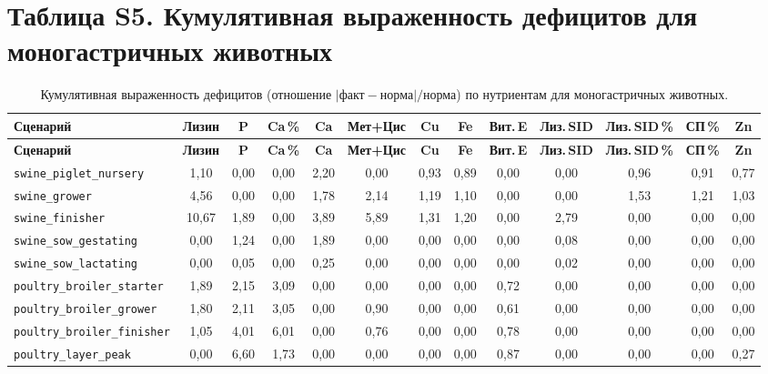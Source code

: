 \documentclass[11pt]{article}
\begin{document}
\section*{Таблица S5. Кумулятивная выраженность дефицитов для моногастричных животных}
{\footnotesize
\begin{longtable}{lcccccccccccc}
\caption{Кумулятивная выраженность дефицитов (отношение $|\text{факт} - \text{норма}| / \text{норма}$) по нутриентам для моногастричных животных.}\label{tab:s5_heatmap} \\
\toprule
\textbf{Сценарий} & \textbf{Лизин} & \textbf{P} & \textbf{Ca\,\%} & \textbf{Ca} & \textbf{Мет+Цис} & \textbf{Cu} & \textbf{Fe} & \textbf{Вит.\,E} & \textbf{Лиз.\,SID} & \textbf{Лиз.\,SID\,\%} & \textbf{СП\,\%} & \textbf{Zn} \\
\midrule
\endfirsthead
\toprule
\textbf{Сценарий} & \textbf{Лизин} & \textbf{P} & \textbf{Ca\,\%} & \textbf{Ca} & \textbf{Мет+Цис} & \textbf{Cu} & \textbf{Fe} & \textbf{Вит.\,E} & \textbf{Лиз.\,SID} & \textbf{Лиз.\,SID\,\%} & \textbf{СП\,\%} & \textbf{Zn} \\
\midrule
\endhead
\bottomrule
\endfoot
\bottomrule
\endlastfoot
\texttt{swine\_piglet\_nursery} & 1{,}10 & 0{,}00 & 0{,}00 & 2{,}20 & 0{,}00 & 0{,}93 & 0{,}89 & 0{,}00 & 0{,}00 & 0{,}96 & 0{,}91 & 0{,}77 \\
\texttt{swine\_grower} & 4{,}56 & 0{,}00 & 0{,}00 & 1{,}78 & 2{,}14 & 1{,}19 & 1{,}10 & 0{,}00 & 0{,}00 & 1{,}53 & 1{,}21 & 1{,}03 \\
\texttt{swine\_finisher} & 10{,}67 & 1{,}89 & 0{,}00 & 3{,}89 & 5{,}89 & 1{,}31 & 1{,}20 & 0{,}00 & 2{,}79 & 0{,}00 & 0{,}00 & 0{,}00 \\
\texttt{swine\_sow\_gestating} & 0{,}00 & 1{,}24 & 0{,}00 & 1{,}89 & 0{,}00 & 0{,}00 & 0{,}00 & 0{,}00 & 0{,}08 & 0{,}00 & 0{,}00 & 0{,}00 \\
\texttt{swine\_sow\_lactating} & 0{,}00 & 0{,}05 & 0{,}00 & 0{,}25 & 0{,}00 & 0{,}00 & 0{,}00 & 0{,}00 & 0{,}02 & 0{,}00 & 0{,}00 & 0{,}00 \\
\texttt{poultry\_broiler\_starter} & 1{,}89 & 2{,}15 & 3{,}09 & 0{,}00 & 0{,}00 & 0{,}00 & 0{,}00 & 0{,}72 & 0{,}00 & 0{,}00 & 0{,}00 & 0{,}00 \\
\texttt{poultry\_broiler\_grower} & 1{,}80 & 2{,}11 & 3{,}05 & 0{,}00 & 0{,}90 & 0{,}00 & 0{,}00 & 0{,}61 & 0{,}00 & 0{,}00 & 0{,}00 & 0{,}00 \\
\texttt{poultry\_broiler\_finisher} & 1{,}05 & 4{,}01 & 6{,}01 & 0{,}00 & 0{,}76 & 0{,}00 & 0{,}00 & 0{,}78 & 0{,}00 & 0{,}00 & 0{,}00 & 0{,}00 \\
\texttt{poultry\_layer\_peak} & 0{,}00 & 6{,}60 & 1{,}73 & 0{,}00 & 0{,}00 & 0{,}00 & 0{,}00 & 0{,}87 & 0{,}00 & 0{,}00 & 0{,}00 & 0{,}27 \\
\end{longtable}
}
\end{document}
